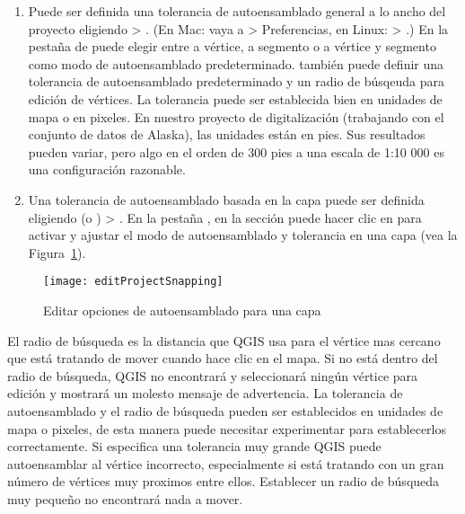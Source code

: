 \begin{enumerate}
\item Puede ser definida una tolerancia de autoensamblado general a lo ancho del proyecto eligiendo
 > . 
(En Mac: vaya a   > Preferencias, en Linux:  > .)
En la pesta\~na de  puede elegir entre a v\'ertice, a segmento o  a v\'ertice y
segmento como modo de autoensamblado predeterminado. también puede definir una tolerancia de
autoensamblado predeterminado y un radio de b\'usqeuda para edici\'on de v\'ertices. La tolerancia puede ser establecida bien
en unidades de mapa o en pixeles.
En nuestro proyecto de digitalizaci\'on (trabajando con el conjunto de datos de Alaska),
las unidades est\'an en pies. Sus resultados pueden variar, pero algo en el
orden de 300 pies a una escala de 1:10 000 es una configuraci\'on razonable.
\item Una tolerancia de autoensamblado basada en la capa puede ser definida eligiendo
 (o ) > . En la pesta\~na , en la secci\'on  puede hacer clic
en  para activar y ajustar el modo de autoensamblado
y tolerancia en una capa (vea la Figura~\ref{fig:snappingoptions}).
\end{enumerate}

\begin{figure}[H]
   \begin{center}
   \caption{Editar opciones de autoensamblado para una capa \nixcaption}\label{fig:snappingoptions}\smallskip
   \texttt{[image: editProjectSnapping]} 
\end{center}  
\end{figure}


El radio de b\'usqueda es la distancia que QGIS usa para  el v\'ertice
mas cercano que est\'a tratando de mover cuando hace clic en el
mapa. Si no est\'a dentro del radio de b\'usqueda, QGIS no encontrar\'a y seleccionar\'a
ning\'un v\'ertice para edici\'on y mostrar\'a un molesto mensaje de advertencia.
La tolerancia de autoensamblado y el radio de b\'usqueda pueden ser establecidos en unidades de mapa o pixeles, de esta manera puede
necesitar experimentar para establecerlos correctamente. Si especifica una tolerancia muy grande
QGIS puede autoensamblar al v\'ertice incorrecto, especialmente si est\'a tratando
con un gran n\'umero de v\'ertices muy proximos entre ellos. Establecer un radio de b\'usqueda muy
peque\~no no encontrar\'a nada a mover.

